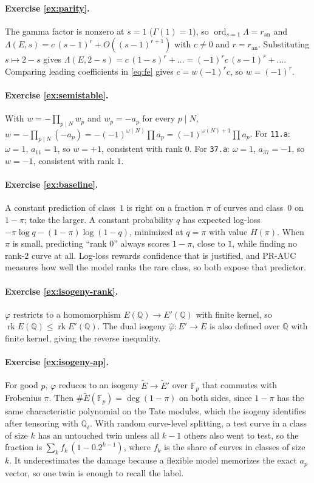 \documentclass[11pt]{article}
\theoremstyle{definition}
\theoremstyle{plain}
\theoremstyle{remark}
\newcommand{\Q}{\mathbb{Q}}
\newcommand{\F}{\mathbb{F}}
\newcommand{\code}[1]{\texttt{#1}}
\renewcommand{\_}{\oldunderscore\allowbreak}
\DeclareMathOperator{\ord}{ord}
\DeclareMathOperator{\rk}{rk}
\begin{document}
\paragraph{Exercise \ref{ex:parity}.}
The gamma factor is nonzero at $s=1$ ($\Gamma(1)=1$), so $\ord_{s=1}\Lambda=r_{\mathrm{an}}$ and
$\Lambda(E,s)=c\,(s-1)^{r}+O((s-1)^{r+1})$ with $c\neq0$ and $r=r_{\mathrm{an}}$. Substituting
$s\mapsto2-s$ gives $\Lambda(E,2-s)=c\,(1-s)^{r}+\dots=(-1)^{r}c\,(s-1)^{r}+\dots$. Comparing
leading coefficients in \eqref{eq:fe} gives $c=w(-1)^{r}c$, so $w=(-1)^{r}$.

\paragraph{Exercise \ref{ex:semistable}.}
With $w=-\prod_{p\mid N}w_p$ and $w_p=-a_p$ for every $p\mid N$,
$w=-\prod_{p\mid N}(-a_p)=-(-1)^{\omega(N)}\prod a_p=(-1)^{\omega(N)+1}\prod a_p$.
For \code{11.a}: $\omega=1$, $a_{11}=1$, so $w=+1$, consistent with rank $0$.
For \code{37.a}: $\omega=1$, $a_{37}=-1$, so $w=-1$, consistent with rank $1$.

\paragraph{Exercise \ref{ex:baseline}.}
A constant prediction of class~$1$ is right on a fraction $\pi$ of curves and class~$0$ on
$1-\pi$; take the larger. A constant probability $q$ has expected log-loss
$-\pi\log q-(1-\pi)\log(1-q)$, minimized at $q=\pi$ with value $H(\pi)$. When $\pi$ is small,
predicting ``rank $0$'' always scores $1-\pi$, close to $1$, while finding no rank-$2$ curve at
all. Log-loss rewards confidence that is justified, and PR-AUC measures how well the model
ranks the rare class, so both expose that predictor.

\paragraph{Exercise \ref{ex:isogeny-rank}.}
$\varphi$ restricts to a homomorphism $E(\Q)\to E'(\Q)$ with finite kernel, so
$\rk E(\Q)\le\rk E'(\Q)$. The dual isogeny $\hat\varphi:E'\to E$ is also defined over $\Q$ with
finite kernel, giving the reverse inequality.

\paragraph{Exercise \ref{ex:isogeny-ap}.}
For good $p$, $\varphi$ reduces to an isogeny $\tilde E\to\tilde E'$ over $\F_p$ that commutes
with Frobenius $\pi$. Then $\#\tilde E(\F_p)=\deg(1-\pi)$ on both sides, since $1-\pi$ has the
same characteristic polynomial on the Tate modules, which the isogeny identifies after
tensoring with $\Q_\ell$. With random curve-level splitting, a test curve in a class of size
$k$ has an untouched twin unless all $k-1$ others also went to test, so the fraction is
$\sum_k f_k\,(1-0.2^{k-1})$, where $f_k$ is the share of curves in classes of size $k$. It
underestimates the damage because a flexible model memorizes the exact $a_p$ vector, so one
twin is enough to recall the label.
\end{document}
